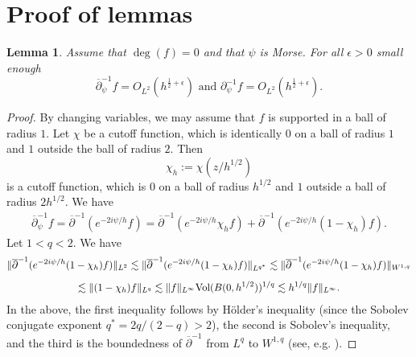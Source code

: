 \documentclass[12pt]{amsart}
\def\p{\partial}
\DeclarePairedDelimiter\norm{\lVert}{\rVert}
\newtheorem{lemma}[theorem]{Lemma}
\theoremstyle{definition}
\theoremstyle{remark}
\newcommand{\eps}{\epsilon}
\newcommand{\op}{\overline \p}
\begin{document}
\section{Proof of lemmas}
\begin{lemma}\label{lem:log_lemma}
 Assume that $\deg(f)=0$ and that $\psi$ is Morse. For all $\eps>0$ small enough
 \[
  \op_\psi^{-1}f=O_{L^2}(h^{\frac{1}{2}+\epsilon}) \text{ and } \p_\psi^{-1}f=O_{L^2}(h^{\frac{1}{2}+\epsilon}).
 \]
\end{lemma}
\begin{proof}
By changing variables, we may assume that $f$ is supported in a ball of radius $1$. Let $\chi$ be a cutoff function, which is identically $0$ on a ball of radius $1$ and $1$ outside the ball of radius $2$. Then
\[
 \chi_h:=\chi(z/h^{1/2})
\]
is a cutoff function, which is $0$ on a ball of radius $h^{1/2}$ and $1$ outside a ball of radius $2h^{1/2}$.  We have
\begin{align}
 \op_\psi^{-1}f=\op^{-1} (e^{-2i\psi/h} f)=\op^{-1} (e^{-2i\psi/h} \chi_h f)+\op^{-1} (e^{-2i\psi/h} (1-\chi_h)f).
\end{align}
 Let $1<q<2$.  We have
\begin{multline*}
 \norm{\op^{-1} (e^{-2i\psi/h} (1-\chi_h)f)}_{L^2}\lesssim  \norm{\op^{-1} (e^{-2i\psi/h} (1-\chi_h)f)}_{L^{q^*}}\lesssim  \norm{\op^{-1} (e^{-2i\psi/h} (1-\chi_h)f)}_{W^{1,q}}\\[5pt]
\lesssim \norm{(1-\chi_h)f}_{L^q}\lesssim \norm{f}_{L^\infty}\text{Vol}(B(0,h^{1/2}))^{1/q}\lesssim h^{1/q} \norm{f}_{L^\infty}.
\end{multline*}
In the above, the first inequality follows by H\"older's inequality (since the Sobolev conjugate exponent $q^*=2q/(2-q)>2$), the  second is Sobolev's inequality, and the third is the boundedness of $\op^{-1}$ from $L^q$ to $W^{1,q}$ (see, e.g. \cite{guillarmou2011identification}).


\end{proof}
\end{document}
